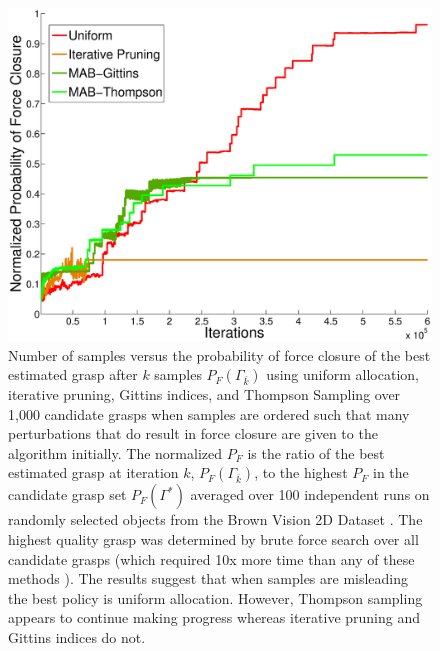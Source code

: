 \documentclass[10pt, conference]{ieeeconf}      %
\begin{document}
\begin{figure}[t!]
\centering
\includegraphics[scale=0.25]{matlab_figures/worst_case.eps}
\caption{ \footnotesize 
	Number of samples versus the probability of force closure of the best estimated grasp after $k$ samples $P_F(\Gamma_{\bar{k}})$ using uniform allocation, iterative pruning, Gittins indices, and Thompson Sampling over 1,000 candidate grasps when samples are ordered such that many perturbations that do result in force closure are given to the algorithm initially.
	The normalized $P_F$ is the ratio of the best estimated grasp at iteration $k$, $P_F(\Gamma_{\bar{k}})$, to the highest $P_F$ in the candidate grasp set $P_F(\Gamma^*)$ averaged over 100 independent runs on randomly selected objects from the Brown Vision 2D Dataset \cite{brown}.
 	The highest quality grasp was determined by brute force search over all candidate grasps (which required 10x  more time than any of these methods \cite{kehoe2012toward}).
 	The results suggest that when samples are misleading the best policy is uniform allocation. 	However, Thompson sampling appears to continue making progress whereas iterative pruning and Gittins indices do not.}
\vspace*{-10pt}
\label{fig:worst_case}
\end{figure}
\end{document}
